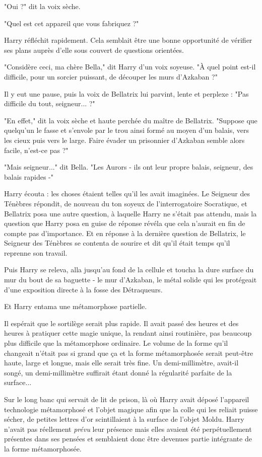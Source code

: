 "Oui ?" dit la voix sèche.

"Quel est cet appareil que vous fabriquez ?"

Harry réfléchit rapidement. Cela semblait être une bonne opportunité de vérifier ses plans auprès d'elle sous couvert de questions orientées.

"Considère ceci, ma chère Bella," dit Harry d'un voix soyeuse. "À quel point est-il difficile, pour un sorcier puissant, de découper les murs d'Azkaban ?"

Il y eut une pause, puis la voix de Bellatrix lui parvint, lente et perplexe : "Pas difficile du tout, seigneur... ?"

"En effet," dit la voix sèche et haute perchée du maître de Bellatrix. "Suppose que quelqu'un le fasse et s'envole par le trou ainsi formé au moyen d'un balais, vers les cieux puis vers le large. Faire évader un prisonnier d'Azkaban semble alors facile, n'est-ce pas ?"

"Mais seigneur..." dit Bella. "Les Aurors - ils ont leur propre balais, seigneur, des balais rapides -"

Harry écouta : les choses étaient telles qu'il les avait imaginées. Le Seigneur des Ténèbres répondit, de nouveau du ton soyeux de l'interrogatoire Socratique, et Bellatrix posa une autre question, à laquelle Harry ne s'était pas attendu, mais la question que Harry posa en guise de réponse révéla que cela n'aurait en fin de compte pas d'importance. Et en réponse à la dernière question de Bellatrix, le Seigneur des Ténèbres se contenta de sourire et dit qu'il était temps qu'il reprenne son travail.

Puis Harry se releva, alla jusqu'au fond de la cellule et toucha la dure surface du mur du bout de sa baguette - le mur d'Azkaban, le métal solide qui les protégeait d'une exposition directe à la fosse des Détraqueurs.

Et Harry entama une métamorphose partielle.

Il espérait que le sortilège serait plus rapide. Il avait passé des heures et des heures à pratiquer cette magie unique, la rendant ainsi routinière, pas beaucoup plus difficile que la métamorphose ordinaire. Le volume de la forme qu'il changeait n'était pas si grand que ça et la forme métamorphosée serait peut-être haute, large et longue, mais elle serait très fine. Un demi-millimètre, avait-il songé, un demi-millimètre suffirait étant donné la régularité parfaite de la surface...

Sur le long banc qui servait de lit de prison, là où Harry avait déposé l'appareil technologie métamorphosé et l'objet magique afin que la colle qui les reliait puisse sécher, de petites lettres d'or scintillaient à la surface de l'objet Moldu. Harry n'avait pas réellement \emph{prévu}  leur présence mais elles avaient été perpétuellement présentes dans ses pensées et semblaient donc être devenues partie intégrante de la forme métamorphosée.

